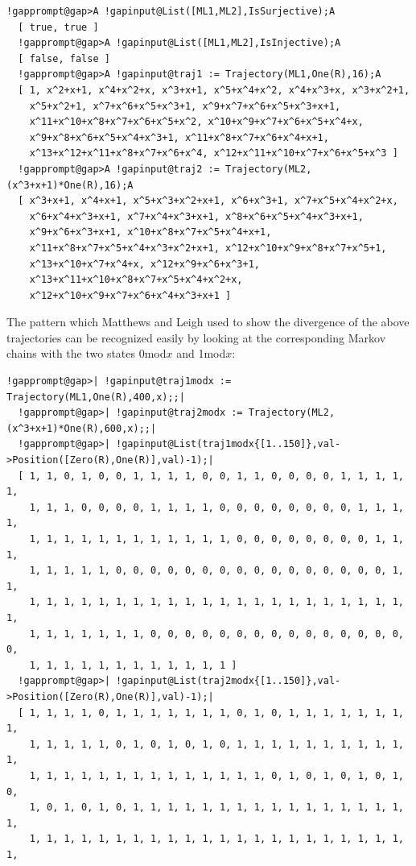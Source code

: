 \documentclass[a4paper,11pt]{report}
\begin{document}
{{\begin{Verbatim}[commandchars=!@A,fontsize=\small,frame=single,label=Example]
  !gapprompt@gap>A !gapinput@List([ML1,ML2],IsSurjective);A
  [ true, true ]
  !gapprompt@gap>A !gapinput@List([ML1,ML2],IsInjective);A
  [ false, false ]
  !gapprompt@gap>A !gapinput@traj1 := Trajectory(ML1,One(R),16);A
  [ 1, x^2+x+1, x^4+x^2+x, x^3+x+1, x^5+x^4+x^2, x^4+x^3+x, x^3+x^2+1, 
    x^5+x^2+1, x^7+x^6+x^5+x^3+1, x^9+x^7+x^6+x^5+x^3+x+1, 
    x^11+x^10+x^8+x^7+x^6+x^5+x^2, x^10+x^9+x^7+x^6+x^5+x^4+x, 
    x^9+x^8+x^6+x^5+x^4+x^3+1, x^11+x^8+x^7+x^6+x^4+x+1, 
    x^13+x^12+x^11+x^8+x^7+x^6+x^4, x^12+x^11+x^10+x^7+x^6+x^5+x^3 ]
  !gapprompt@gap>A !gapinput@traj2 := Trajectory(ML2,(x^3+x+1)*One(R),16);A
  [ x^3+x+1, x^4+x+1, x^5+x^3+x^2+x+1, x^6+x^3+1, x^7+x^5+x^4+x^2+x, 
    x^6+x^4+x^3+x+1, x^7+x^4+x^3+x+1, x^8+x^6+x^5+x^4+x^3+x+1, 
    x^9+x^6+x^3+x+1, x^10+x^8+x^7+x^5+x^4+x+1, 
    x^11+x^8+x^7+x^5+x^4+x^3+x^2+x+1, x^12+x^10+x^9+x^8+x^7+x^5+1, 
    x^13+x^10+x^7+x^4+x, x^12+x^9+x^6+x^3+1, 
    x^13+x^11+x^10+x^8+x^7+x^5+x^4+x^2+x, 
    x^12+x^10+x^9+x^7+x^6+x^4+x^3+x+1 ]
\end{Verbatim}
 The pattern which Matthews and Leigh used to show the divergence of the above
trajectories can be recognized easily by looking at the corresponding Markov
chains with the two states 0{\nobreakspace}mod{\nobreakspace}$x$ and 1{\nobreakspace}mod{\nobreakspace}$x$: 
\begin{Verbatim}[commandchars=!@|,fontsize=\small,frame=single,label=Example]
  !gapprompt@gap>| !gapinput@traj1modx := Trajectory(ML1,One(R),400,x);;|
  !gapprompt@gap>| !gapinput@traj2modx := Trajectory(ML2,(x^3+x+1)*One(R),600,x);;|
  !gapprompt@gap>| !gapinput@List(traj1modx{[1..150]},val->Position([Zero(R),One(R)],val)-1);|
  [ 1, 1, 0, 1, 0, 0, 1, 1, 1, 1, 0, 0, 1, 1, 0, 0, 0, 0, 1, 1, 1, 1, 1, 
    1, 1, 1, 0, 0, 0, 0, 1, 1, 1, 1, 0, 0, 0, 0, 0, 0, 0, 0, 1, 1, 1, 1, 
    1, 1, 1, 1, 1, 1, 1, 1, 1, 1, 1, 1, 0, 0, 0, 0, 0, 0, 0, 0, 1, 1, 1, 
    1, 1, 1, 1, 1, 0, 0, 0, 0, 0, 0, 0, 0, 0, 0, 0, 0, 0, 0, 0, 0, 1, 1, 
    1, 1, 1, 1, 1, 1, 1, 1, 1, 1, 1, 1, 1, 1, 1, 1, 1, 1, 1, 1, 1, 1, 1, 
    1, 1, 1, 1, 1, 1, 1, 0, 0, 0, 0, 0, 0, 0, 0, 0, 0, 0, 0, 0, 0, 0, 0, 
    1, 1, 1, 1, 1, 1, 1, 1, 1, 1, 1, 1 ]
  !gapprompt@gap>| !gapinput@List(traj2modx{[1..150]},val->Position([Zero(R),One(R)],val)-1);|
  [ 1, 1, 1, 1, 0, 1, 1, 1, 1, 1, 1, 1, 0, 1, 0, 1, 1, 1, 1, 1, 1, 1, 1, 
    1, 1, 1, 1, 1, 0, 1, 0, 1, 0, 1, 0, 1, 1, 1, 1, 1, 1, 1, 1, 1, 1, 1, 
    1, 1, 1, 1, 1, 1, 1, 1, 1, 1, 1, 1, 1, 1, 0, 1, 0, 1, 0, 1, 0, 1, 0, 
    1, 0, 1, 0, 1, 0, 1, 1, 1, 1, 1, 1, 1, 1, 1, 1, 1, 1, 1, 1, 1, 1, 1, 
    1, 1, 1, 1, 1, 1, 1, 1, 1, 1, 1, 1, 1, 1, 1, 1, 1, 1, 1, 1, 1, 1, 1, 

\end{Verbatim}}}
\end{document}

